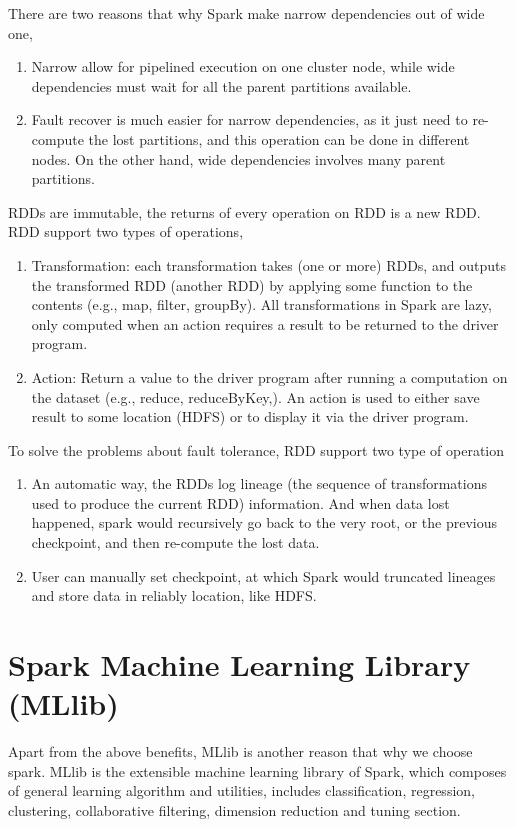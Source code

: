 There are two reasons that why Spark make narrow dependencies out of wide one\cite{zaharia2016architecture},
\begin{enumerate}
	\item Narrow allow for pipelined execution on one cluster node, while wide dependencies must wait for all the parent partitions available.
	\item Fault recover is much easier for narrow dependencies, as it just need to re-compute the lost partitions, and this operation can be done in different nodes. On the other hand, wide dependencies involves many parent partitions.
\end{enumerate}

RDDs are immutable, the returns of every operation on RDD is a new RDD. RDD support two types of operations,

\begin{enumerate}
	\item Transformation: each transformation takes (one or more) RDDs, and outputs the transformed RDD (another RDD) by applying some function to the contents (e.g., map, filter, groupBy). All transformations in Spark are lazy, only computed when an action requires a result to be returned to the driver program.
	\item Action: Return a value to the driver program after running a computation on the dataset (e.g., reduce, reduceByKey,). An action is used to either save result to some location (HDFS) or to display it via the driver program.
\end{enumerate}

To solve the problems about fault tolerance, RDD support two type of operation

\begin{enumerate}
	\item An automatic way, the RDDs log lineage (the sequence of transformations used to produce the current RDD) information. And when data lost happened, spark would recursively go back to the very root, or the previous checkpoint, and then re-compute the lost data.
	\item User can manually set checkpoint, at which Spark would truncated lineages and store data in reliably location, like HDFS.
\end{enumerate}

\section{Spark Machine Learning Library (MLlib)\cite{apache_spark_mllib}}
Apart from the above benefits, MLlib is another reason that why we choose spark. MLlib is the extensible machine learning  library of Spark, which composes of general learning algorithm and utilities, includes classification, regression, clustering, collaborative filtering, dimension reduction and tuning section.\\



